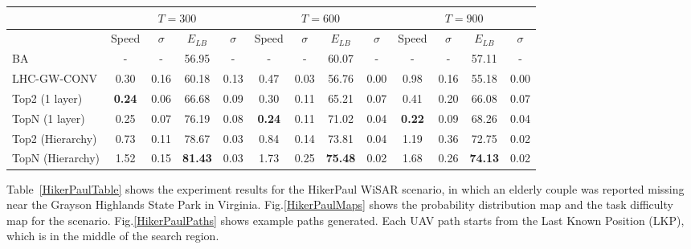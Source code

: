\begin{center}
\begin{table*}
{
\scriptsize
\hfill{}
\setlength{\extrarowheight}{1.5pt}
\begin{tabular}
{|l|c|c|c|c|c|c|c|c|c|c|c|c|}
\hline
& \multicolumn{4}{|c|}{$T=300$} & \multicolumn{4}{|c|}{$T=600$} & \multicolumn{4}{|c|}{$T=900$} \\ 
\hline
& Speed & $\sigma$ & $\mathit{E_{LB}}$ & $\sigma$ & Speed & $\sigma$ & $\mathit{E_{LB}}$ & $\sigma$ & Speed & $\sigma$ & $\mathit{E_{LB}}$ & $\sigma$\\ 
\hline
BA & - & - & 56.95 & - & - & - & 60.07 & - & - & - & 57.11 & - \\ 
\hline
LHC-GW-CONV & 0.30 & 0.16 & 60.18 & 0.13 & 0.47 & 0.03 & 56.76 & 0.00 & 0.98 & 0.16 & 55.18 & 0.00\\ 
\hline
Top2 (1 layer) & \textbf{0.24} & 0.06 & 66.68 & 0.09 & 0.30 & 0.11 & 65.21 & 0.07 & 0.41 & 0.20 & 66.08 & 0.07\\ 
\hline
TopN (1 layer) & 0.25 & 0.07 & 76.19 & 0.08 & \textbf{0.24} & 0.11 & 71.02 & 0.04 & \textbf{0.22} & 0.09 & 68.26 & 0.04\\ 
\hline
Top2 (Hierarchy) & 0.73 & 0.11 & 78.67 & 0.03 & 0.84 & 0.14 & 73.81 & 0.04 & 1.19 & 0.36 & 72.75 & 0.02\\ 
\hline
TopN (Hierarchy) & 1.52 & 0.15 & \textbf{81.43} & 0.03 & 1.73 & 0.25 & \textbf{75.48} & 0.02 & 1.68 & 0.26 & \textbf{74.13} & 0.02\\ 
\hline
\end{tabular}}
\medskip
\caption{Algorithms speed and $\mathit{Efficiency_{LB}}$ comparison for the HikerPaul scenario.}
\label{HikerPaulTable}
\end{table*}
\end{center}
Table~\ref{HikerPaulTable} shows the experiment results for the HikerPaul WiSAR scenario, in which an elderly couple was reported missing near the Grayson Highlands State Park in Virginia. Fig.\ref{HikerPaulMaps} shows the probability distribution map and the task difficulty map for the scenario. Fig.\ref{HikerPaulPaths} shows example paths generated. Each UAV path starts from the Last Known Position (LKP), which is in the middle of the search region.

